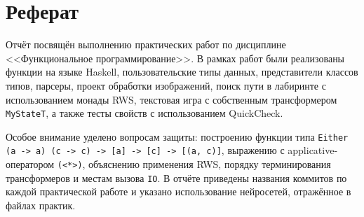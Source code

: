 \section*{Реферат}

Отчёт посвящён выполнению практических работ по дисциплине <<Функциональное программирование>>. В рамках работ были реализованы функции на языке Haskell, пользовательские типы данных, представители классов типов, парсеры, проект обработки изображений, поиск пути в лабиринте с использованием монады RWS, текстовая игра с собственным трансформером \texttt{MyStateT}, а также тесты свойств с использованием QuickCheck.

Особое внимание уделено вопросам защиты: построению функции типа \texttt{Either (a -> a) (c -> c) -> [a] -> [c] -> [(a, c)]}, выражению с applicative-оператором \texttt{(<*>)}, объяснению применения RWS, порядку терминирования трансформеров и местам вызова \texttt{IO}. В отчёте приведены названия коммитов по каждой практической работе и указано использование нейросетей, отражённое в файлах практик.

\newpage
